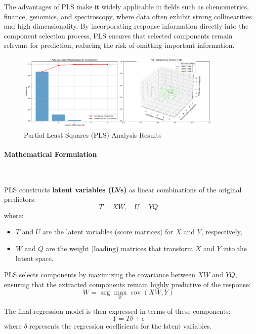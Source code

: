 \documentclass[11pt,twoside,a4paper]{article}
\begin{document}
The advantages of PLS make it widely applicable in fields such as chemometrics, finance, genomics, and spectroscopy, where data often exhibit strong collinearities and high dimensionality. By incorporating response information directly into the component selection process, PLS ensures that selected components remain relevant for prediction, reducing the risk of omitting important information.

\begin{figure}[H]
    \centering
    \includegraphics[width=0.9\textwidth]{PLS_Selected_Analysis.png}
    \caption{Partial Least Squares (PLS) Analysis Results}
    \label{fig:PLS_analysis}
\end{figure}

\paragraph {Mathematical Formulation} \ \

PLS constructs \textbf{latent variables (LVs)} as linear combinations of the original predictors:
\begin{equation}
T = XW, \quad U = YQ
\end{equation}
where:
\begin{itemize}
    \item \( T \) and \( U \) are the latent variables (score matrices) for \( X \) and \( Y \), respectively,
    \item \( W \) and \( Q \) are the weight (loading) matrices that transform \( X \) and \( Y \) into the latent space.
\end{itemize}

PLS selects components by maximizing the covariance between \( XW \) and \( YQ \), ensuring that the extracted components remain highly predictive of the response:
\begin{equation}
W = \arg\max_W \operatorname{cov}(XW, Y)
\end{equation}

The final regression model is then expressed in terms of these components:
\begin{equation}
Y = T \delta + \epsilon
\end{equation}
where \( \delta \) represents the regression coefficients for the latent variables.
\newpage
\end{document}
